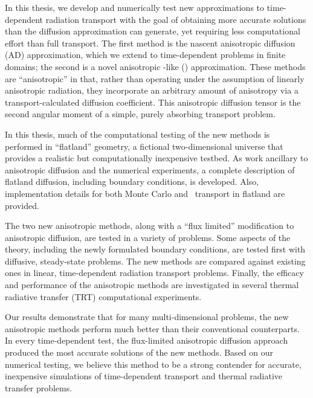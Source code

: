 

In this thesis, we develop and numerically test new approximations to
time-dependent radiation transport with the goal of obtaining more accurate
solutions than the diffusion approximation can generate, yet requiring less
computational effort than full transport.
The first method is the nascent anisotropic diffusion (AD)
approximation, which we extend to time-dependent problems in finite domains; the
second is a novel anisotropic \Pone-like (\APone) approximation. These methods
are ``anisotropic'' in that, rather than operating under the assumption of
linearly anisotropic radiation, they incorporate an arbitrary amount of
anisotropy via a transport-calculated diffusion coefficient. This anisotropic
diffusion tensor is the second angular moment of a simple, purely
absorbing transport problem.

In this thesis, much of the computational testing of the new methods is performed in
``flatland'' geometry, a fictional two-dimensional universe that provides a
realistic but computationally inexpensive testbed. As work ancillary to
anisotropic
diffusion and the numerical experiments, a complete description
of flatland diffusion, including boundary conditions, is developed. Also,
implementation details for both Monte Carlo and \SN\ transport in
flatland are provided.

The two new anisotropic methods, along with a ``flux limited'' modification to
anisotropic diffusion, are tested in a variety of problems. Some aspects of the
theory, including the newly formulated boundary conditions, are tested first with
diffusive, steady-state problems. The new methods are compared against
existing ones in linear, time-dependent radiation transport problems. Finally,
the efficacy and performance of the anisotropic methods are investigated in
several thermal radiative transfer (TRT) computational experiments.

Our results demonstrate that for many multi-dimensional problems, the new
anisotropic methods perform much better than their conventional counterparts.
In every time-dependent test, the flux-limited anisotropic diffusion
approach produced the most accurate solutions of the new methods.
Based on our numerical testing, we believe this method to be a strong contender
for accurate, inexpensive simulations of time-dependent transport and
thermal radiative transfer problems.
